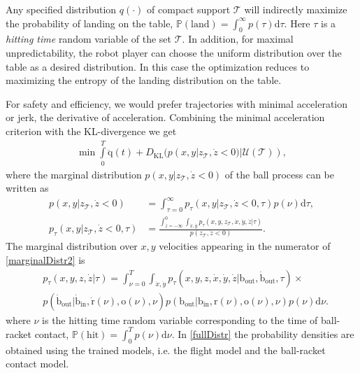 \documentclass[letterpaper, 10 pt, conference]{ieeeconf}
\newcommand{\boldvec}[1]{\boldsymbol{\mathrm{#1}}}
\let\vec\boldvec
\newcommand{\joint}{\vec{q}} %
\newcommand{\ball}{\vec{b}} %
\newcommand{\racket}{\vec{r}} %
\newcommand{\orient}{\vec{o}} %
\newcommand{\court}{\mathcal{T}} %
\newcommand{\prob}{\mathbb{P}} %
\newcommand{\landTime}{\tau} %
\newcommand{\landDist}{p(\tau)} %
\newcommand{\hitTime}{\nu} %
\newcommand{\hitDist}{p(\nu)} %
\newcommand{\KL}{D_{\mathrm{KL}}}
\begin{document}
Any specified distribution $q(\cdot)$ of compact support $\court$ will indirectly maximize the probability of landing on the table, $\prob(\textrm{land}) = \int_{0}^{\infty}\landDist\textrm{d}\landTime$. Here $\landTime$ is a \emph{hitting time} random variable of the set $\court$. In addition, for maximal unpredictability, the robot player can choose the uniform distribution over the table as a desired distribution. In this case the optimization reduces to maximizing the entropy of the landing distribution on the table. 

For safety and efficiency, we would prefer trajectories with minimal acceleration or jerk, the derivative of acceleration. Combining the minimal acceleration criterion with the KL-divergence we get
%
\begin{align}
\min \int\limits_{0}^{T}\ddot{\joint}(t) + \KL(p(x,y|z_{\court},\dot{z}<0)|\mathcal{U}(\court)),
\label{costFnc1}
\end{align}
%
where the marginal distribution $p(x,y|z_{\court},\dot{z}<0)$ of the ball process can be written as
%
\begin{align}
p(x,y|z_{\court},\dot{z}<0) &= \int_{\landTime = 0}^{\infty} p_{\landTime}(x,y|z_{\court},\dot{z}<0,\landTime)\hitDist \textrm{d}\landTime \label{marginalDistr1}, \\
p_{\landTime}(x,y|z_{\court},\dot{z}<0,\landTime) &= \frac{ \int_{\dot{z}=-\infty}^{0}\int_{\dot{x},\dot{y}}p_{\landTime}(x,y,z_{\court},\dot{x},\dot{y},\dot{z}|\landTime)}{p(z_{\court},\dot{z}<0)}.
\label{marginalDistr2}
\end{align}
%
The marginal distribution over $x,y$ velocities appearing in the numerator of \eqref{marginalDistr2} is
\begin{align}
& p_{\landTime}(x,y,z,\dot{z}|\landTime) = \int_{\hitTime = 0}^{T} \int_{\dot{x},\dot{y}}  p_{\landTime}(x,y,z,\dot{x},\dot{y},\dot{z}|\ball_{\textrm{out}},\dot{\ball}_{\textrm{out}},\landTime) \times \\
& p(\dot{\ball}_{\textrm{out}}|\dot{\ball}_{\textrm{in}},\dot{\racket}(\hitTime),\orient(\hitTime),\hitTime)p(\ball_{\textrm{out}}|\ball_{\textrm{in}},\racket(\hitTime),\orient(\hitTime),\hitTime)\hitDist\textrm{d}\hitTime.
\label{fullDistr}
\end{align}
%
where $\hitTime$ is the hitting time random variable corresponding to the time of ball-racket contact, $\prob(\textrm{hit}) = \int_{0}^{T}\hitDist\textrm{d}\hitTime$. In \eqref{fullDistr} the probability densities are obtained using the trained models, i.e. the flight model and the ball-racket contact model. 
\end{document}
